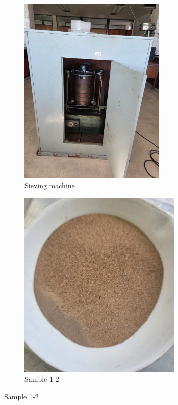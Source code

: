 \begin{figure}[H]
    \centering
    \begin{subfigure}[b]{0.48\textwidth}
        \includegraphics[width=\linewidth, height =9cm]{figures/appendix-f/sievingmachine.png}
        \caption{Sieving machine}
        \label{fig:SM}
    \end{subfigure}
    \hfill
    \begin{subfigure}[b]{0.48\textwidth}
        \includegraphics[width=\linewidth, height =9cm]{figures/appendix-f/sand.png}
        \caption{Sample 1-2}
        \label{fig:second}
    \end{subfigure}
    

    \vspace{0.5cm}


\end{figure}
